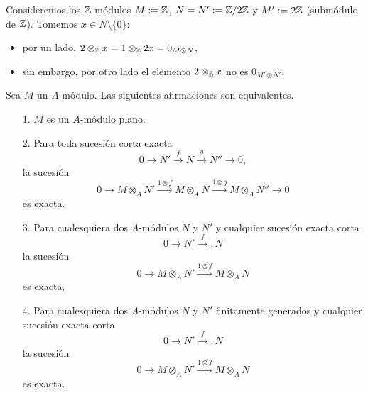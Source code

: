 \documentclass[../main.tex]{subfiles}
\begin{document}
\begin{example}
	Consideremos los $\mathbb{Z}$-módulos $M:=\mathbb{Z}$, $N=N':=\mathbb{Z}/2\mathbb{Z}$ y $M':=2\mathbb{Z}$ (submódulo de $\mathbb{Z}$). Tomemos $x\in N\setminus\{0\}$:
	\begin{itemize}
		\item por un lado, $2\otimes_{\mathbb{Z}} x=1\otimes_{\mathbb{Z}} 2x=0_{M\otimes N}$,
		\item sin embargo, por otro lado el elemento $2\otimes_{\mathbb{Z}} x$ no es $0_{M'\otimes N'}$. 
	\end{itemize}
\end{example}

\begin{proposition}
	Sea $M$ un $A$-módulo. Las siguientes afirmaciones son equivalentes.
	\begin{itemize}
		\item[1.] $M$ es un $A$-módulo plano.
		\item[2.] Para toda sucesión corta exacta $$0\longrightarrow N'\overset{f}{\longrightarrow}N\overset{g}{\longrightarrow}N''\longrightarrow 0,$$
		la sucesión $$0\longrightarrow M\otimes_A N'\overset{1\otimes f}{\longrightarrow}M\otimes_A N\overset{1\otimes g}{\longrightarrow}M\otimes_A N''\longrightarrow 0$$ es exacta.
		\item[3.] Para cualesquiera dos $A$-módulos $N$ y $N'$ y cualquier sucesión exacta corta $$0\longrightarrow N'\overset{f}{\longrightarrow},N$$ la sucesión $$0\longrightarrow M\otimes_A N'\overset{1\otimes f}{\longrightarrow}M\otimes_A N$$ es exacta.
		\item[4.] Para cualesquiera dos $A$-módulos $N$ y $N'$ finitamente generados y cualquier sucesión exacta corta $$0\longrightarrow N'\overset{f}{\longrightarrow},N$$ la sucesión $$0\longrightarrow M\otimes_A N'\overset{1\otimes f}{\longrightarrow}M\otimes_A N$$ es exacta.
	\end{itemize}
\end{proposition}
\end{document}
